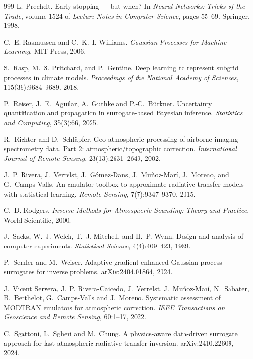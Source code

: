\begin{thebibliography}{999}
L.~Prechelt.
\newblock Early stopping --- but when?
\newblock In \emph{Neural Networks: Tricks of the Trade}, volume 1524 of \emph{Lecture Notes
in Computer Science}, pages 55--69. Springer, 1998.

C.~E. Rasmussen and C.~K.~I. Williams.
\newblock \emph{Gaussian Processes for Machine Learning}.
\newblock MIT Press, 2006.

S.~Rasp, M.~S. Pritchard, and P.~Gentine.
\newblock Deep learning to represent subgrid processes in climate models.
\newblock \emph{Proceedings of the National Academy of Sciences}, 115(39):9684--9689, 2018.

P.~Reiser, J.~E.~Aguilar, A.~Guthke and P.-C.~B\"urkner.
\newblock Uncertainty quantification and propagation in surrogate-based Bayesian inference.
\newblock \emph{Statistics and Computing}, 35(3):66, 2025.

R.~Richter and D.~Schl\"apfer.
\newblock Geo-atmospheric processing of airborne imaging spectrometry data. Part 2: atmospheric/topographic correction.
\newblock \emph{International Journal of Remote Sensing}, 23(13):2631--2649, 2002.

J.~P. Rivera, J.~Verrelst, J.~G\'omez-Dans, J.~Mu\~noz-Mar\'i, J.~Moreno, and G.~Camps-Valls.
\newblock An emulator toolbox to approximate radiative transfer models with statistical
learning.
\newblock \emph{Remote Sensing}, 7(7):9347--9370, 2015.

C.~D. Rodgers.
\newblock \emph{Inverse Methods for Atmospheric Sounding: Theory and Practice}.
\newblock World Scientific, 2000.

J.~Sacks, W.~J. Welch, T.~J. Mitchell, and H.~P. Wynn.
\newblock Design and analysis of computer experiments.
\newblock \emph{Statistical Science}, 4(4):409--423, 1989.

P.~Semler and M.~Weiser.
\newblock Adaptive gradient enhanced Gaussian process surrogates for inverse problems.
\newblock arXiv:2404.01864, 2024.

J.~Vicent Servera, J.~P. Rivera-Caicedo, J.~Verrelst, J.~Mu\~noz-Mar\'i, N.~Sabater, B.~Berthelot, G.~Camps-Valls and
J.~Moreno.
\newblock Systematic assessment of {MODTRAN} emulators for atmospheric correction.
\newblock \emph{IEEE Transactions on Geoscience and Remote Sensing}, 60:1--17, 2022.

C.~Sgattoni, L.~Sgheri and M.~Chung.
\newblock A physics-aware data-driven surrogate approach for fast atmospheric radiative transfer inversion.
\newblock arXiv:2410.22609, 2024.


\end{thebibliography}
